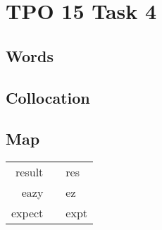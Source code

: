 \section{TPO 15 Task 4}

\subsection{Words}

\subsection{Collocation}

\subsection{Map}

\begin{tabular}{rc@{\quad$\to$\quad}l}
    result &  & res  \\
    eazy   &  & ez   \\
    expect &  & expt \\
\end{tabular}

